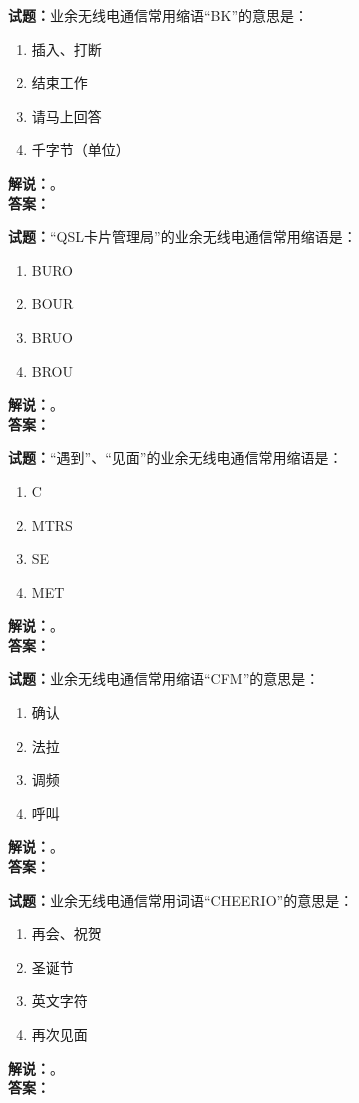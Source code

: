 \documentclass{ctexbook}
\begin{document}
\noindent\textbf{试题：}业余无线电通信常用缩语“BK”的意思是：
\begin{enumerate}[leftmargin=3em]
\item 插入、打断
\item 结束工作
\item 请马上回答
\item 千字节（单位）
\end{enumerate}
\noindent\textbf{解说：}\textbf{}。\\\noindent\textbf{答案：}

\bigskip




\noindent\textbf{试题：}“QSL卡片管理局”的业余无线电通信常用缩语是：
\begin{enumerate}[leftmargin=3em]
\item BURO
\item BOUR
\item BRUO
\item BROU
\end{enumerate}
\noindent\textbf{解说：}\textbf{}。\\\noindent\textbf{答案：}

\bigskip




\noindent\textbf{试题：}“遇到”、“见面”的业余无线电通信常用缩语是：
\begin{enumerate}[leftmargin=3em]
\item C
\item MTRS
\item SE
\item MET
\end{enumerate}
\noindent\textbf{解说：}\textbf{}。\\\noindent\textbf{答案：}

\bigskip




\noindent\textbf{试题：}业余无线电通信常用缩语“CFM”的意思是：
\begin{enumerate}[leftmargin=3em]
\item 确认
\item 法拉
\item 调频
\item 呼叫
\end{enumerate}
\noindent\textbf{解说：}\textbf{}。\\\noindent\textbf{答案：}

\bigskip




\noindent\textbf{试题：}业余无线电通信常用词语“CHEERIO”的意思是：
\begin{enumerate}[leftmargin=3em]
\item 再会、祝贺
\item 圣诞节
\item 英文字符
\item 再次见面
\end{enumerate}
\noindent\textbf{解说：}\textbf{}。\\\noindent\textbf{答案：}
\end{document}
